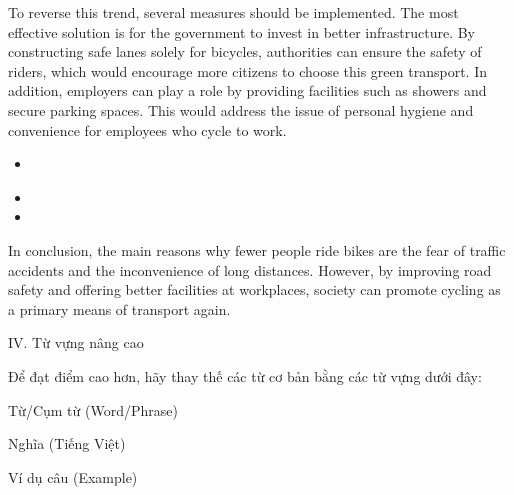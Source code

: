 \documentclass{../templateWriting/cdwriting}
\begin{document}

To reverse this trend, several measures should be implemented. The most effective solution is for the government to invest in better infrastructure. By constructing safe lanes solely for bicycles, authorities can ensure the safety of riders, which would encourage more citizens to choose this green transport. In addition, employers can play a role by providing facilities such as showers and secure parking spaces. This would address the issue of personal hygiene and convenience for employees who cycle to work.

\begin{itemize}
\item {}
\end{itemize}

\begin{itemize}
\item {}
\item {}
\end{itemize}


In conclusion, the main reasons why fewer people ride bikes are the fear of traffic accidents and the inconvenience of long distances. However, by improving road safety and offering better facilities at workplaces, society can promote cycling as a primary means of transport again.


IV. Từ vựng nâng cao

Để đạt điểm cao hơn, hãy thay thế các từ cơ bản bằng các từ vựng dưới đây:

Từ/Cụm từ (Word/Phrase)

Nghĩa (Tiếng Việt)

Ví dụ câu (Example)
\end{document}
